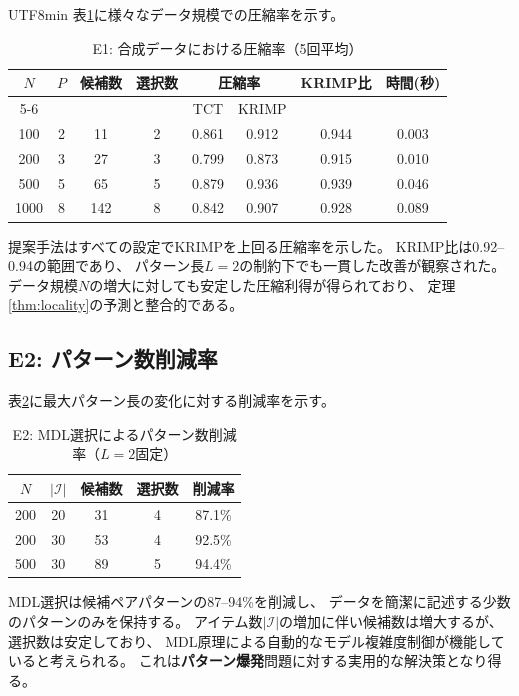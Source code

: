 \documentclass[11pt,a4paper]{article}
\begin{document}
\begin{CJK}{UTF8}{min}
表\ref{tab:e1}に様々なデータ規模での圧縮率を示す。

\begin{table}[t]
\centering
\caption{E1: 合成データにおける圧縮率（5回平均）}\label{tab:e1}
\begin{tabular}{cccccccc}
\toprule
$N$ & $P$ & 候補数 & 選択数 & \multicolumn{2}{c}{圧縮率} & KRIMP比 & 時間(秒) \\
\cmidrule(lr){5-6}
 & & & & TCT & KRIMP & & \\
\midrule
100 & 2 & 11  & 2 & 0.861 & 0.912 & 0.944 & 0.003 \\
200 & 3 & 27  & 3 & 0.799 & 0.873 & 0.915 & 0.010 \\
500 & 5 & 65  & 5 & 0.879 & 0.936 & 0.939 & 0.046 \\
1000 & 8 & 142 & 8 & 0.842 & 0.907 & 0.928 & 0.089 \\
\bottomrule
\end{tabular}
\end{table}

提案手法はすべての設定でKRIMPを上回る圧縮率を示した。
KRIMP比は0.92--0.94の範囲であり、
パターン長$L{=}2$の制約下でも一貫した改善が観察された。
データ規模$N$の増大に対しても安定した圧縮利得が得られており、
定理\ref{thm:locality}の予測と整合的である。

\subsection{E2: パターン数削減率}

表\ref{tab:e2}に最大パターン長の変化に対する削減率を示す。

\begin{table}[t]
\centering
\caption{E2: MDL選択によるパターン数削減率（$L{=}2$固定）}\label{tab:e2}
\begin{tabular}{ccccc}
\toprule
$N$ & $|\mathcal{I}|$ & 候補数 & 選択数 & 削減率 \\
\midrule
200 & 20 & 31  & 4 & 87.1\% \\
200 & 30 & 53  & 4 & 92.5\% \\
500 & 30 & 89  & 5 & 94.4\% \\
\bottomrule
\end{tabular}
\end{table}

MDL選択は候補ペアパターンの87--94\%を削減し、
データを簡潔に記述する少数のパターンのみを保持する。
アイテム数$|\mathcal{I}|$の増加に伴い候補数は増大するが、
選択数は安定しており、
MDL原理による自動的なモデル複雑度制御が機能していると考えられる。
これは\textbf{パターン爆発}問題に対する実用的な解決策となり得る。


\end{CJK}
\end{document}
